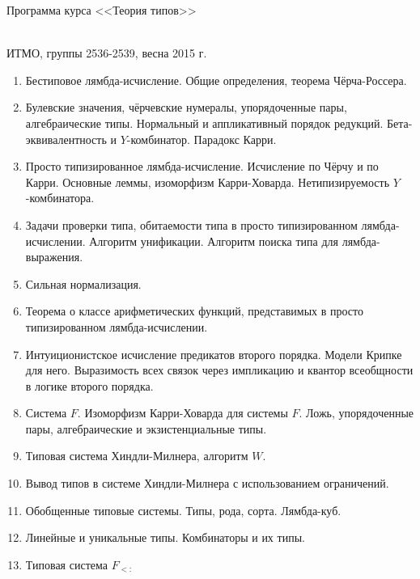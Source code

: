 \documentclass[12pt,a4paper,oneside]{book}
\begin{document}
\begin{center}
\begin{Large}Программа курса <<Теория типов>>\end{Large}\\
ИТМО, группы 2536-2539, весна 2015 г.
\end{center}

\begin{enumerate}
\item Бестиповое лямбда-исчисление. Общие определения, теорема Чёрча-Россера.
\item Булевские значения, чёрчевские нумералы, упорядоченные пары, 
алгебраические типы. Нормальный и аппликативный порядок редукций.
Бета-эквивалентность и $Y$-комбинатор. Парадокс Карри.
\item Просто типизированное лямбда-исчисление. Исчисление по Чёрчу и по Карри.
Основные леммы, изоморфизм Карри-Ховарда. Нетипизируемость $Y$-комбинатора.
\item Задачи проверки типа, обитаемости типа в просто типизированном лямбда-исчислении.
Алгоритм унификации. Алгоритм поиска типа для лямбда-выражения.
\item Сильная нормализация.
\item Теорема о классе арифметических функций, представимых в просто типизированном лямбда-исчислении.
\item Интуиционистское исчисление предикатов второго порядка. Модели Крипке для него.
Выразимость всех связок через импликацию и квантор всеобщности в логике второго порядка.
\item Система $F$. Изоморфизм Карри-Ховарда для системы $F$.
Ложь, упорядоченные пары, алгебраические и экзистенциальные типы.
\item Типовая система Хиндли-Милнера, алгоритм $W$.
\item Вывод типов в системе Хиндли-Милнера с использованием ограничений.
\item Обобщенные типовые системы. Типы, рода, сорта. Лямбда-куб.
\item Линейные и уникальные типы. Комбинаторы  и их типы.
\item Типовая система $F_{<:}$
\end{enumerate}
\end{document}
